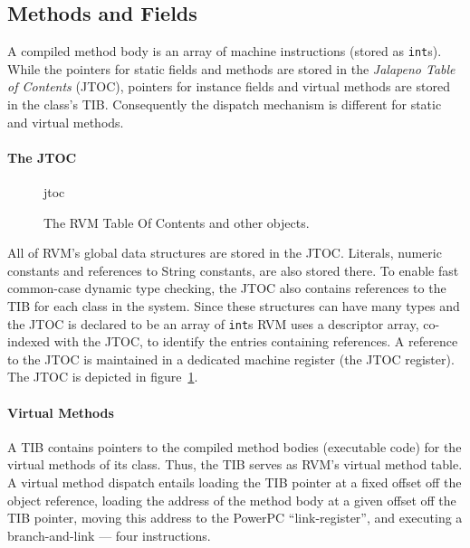 \subsection{Methods and Fields}\label{sssec:methods}
A compiled method body is an array of machine instructions (stored as
{\tt int}s). 
While the pointers for static fields and methods are stored in the 
{\em Jalapeno Table of Contents} (JTOC),
pointers for instance fields and virtual methods are stored in the class's TIB.
Consequently the dispatch mechanism is different for static and virtual 
methods.

\paragraph{The JTOC}
\begin{figure}[htb]
\begin{gif}{jtoc}
\vbox{
\hbox{}
}\hfil
\end{gif}
\caption{The RVM Table Of Contents and other objects.}
\label{fig:jtoc}
\end{figure}
All of RVM's global data structures are stored in the JTOC. 
Literals, numeric
constants and references to String constants, are also stored there.
To enable fast common-case dynamic type checking, the JTOC also
contains references to the TIB for each class in the system.  
Since these 
structures can have many types and the JTOC is declared to be an array of 
{\tt int}s  
RVM uses a descriptor array, co-indexed with the JTOC, 
to identify the entries containing references.
A reference to the JTOC is maintained in a dedicated machine register 
(the JTOC register).
The JTOC
is depicted in figure~\ref{fig:jtoc}.  

\paragraph{Virtual Methods}
A TIB contains pointers to the compiled method 
bodies (executable code) for the virtual methods of its class. 
Thus, the TIB serves as RVM's virtual method table.
A
virtual method dispatch entails loading the TIB pointer at a fixed
offset off the object reference, loading the address of the method
body at a given offset off the TIB pointer, moving this address to the
PowerPC ``link-register'', and executing a branch-and-link --- four
instructions.

